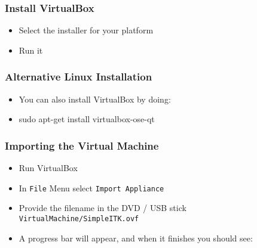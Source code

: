 \begin{frame}
\frametitle{Install VirtualBox}
\begin{itemize}
\item Select the installer for your platform
\item Run it
\end{itemize}
\end{frame}

\begin{frame}
\frametitle{Alternative Linux Installation}
\begin{itemize}
\item  You can also install VirtualBox by doing:
\item  sudo apt-get install virtualbox-ose-qt
\end{itemize}
\end{frame}

\begin{frame}
\frametitle{Importing the Virtual Machine}
\begin{itemize}
\item Run VirtualBox
\item In \texttt{File} Menu select \texttt{Import Appliance}
\item Provide the filename in the DVD / USB stick \texttt{VirtualMachine/SimpleITK.ovf}
\item A progress bar will appear, and when it finishes you should see:
\end{itemize}
\begin{center}
\end{center}
\end{frame}


